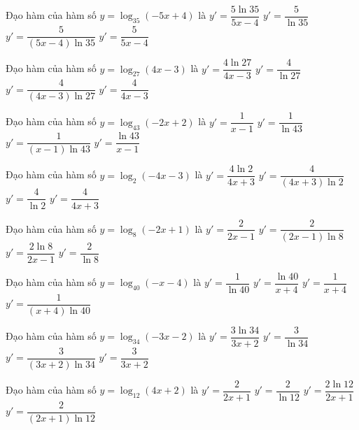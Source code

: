 \documentclass[12pt,a4paper]{article}
\begin{document}
\begin{ex}
Đạo hàm của hàm số $y=\log_{35}(-5x+4)$ là
\choice
{$y'=\dfrac{5\ln{35}}{5x-4}$}
{$y'=\dfrac{5}{\ln{35}}$}
{\True $y'=\dfrac{5}{(5x-4)\ln 35}$}
{$y'=\dfrac{5}{5x-4}$}
\end{ex}
\begin{ex}
Đạo hàm của hàm số $y=\log_{27}(4x-3)$ là
\choice
{$y'=\dfrac{4\ln{27}}{4x-3}$}
{$y'=\dfrac{4}{\ln{27}}$}
{\True $y'=\dfrac{4}{(4x-3)\ln 27}$}
{$y'=\dfrac{4}{4x-3}$}
\end{ex}
\begin{ex}
Đạo hàm của hàm số $y=\log_{43}(-2x+2)$ là
\choice
{$y'=\dfrac{1}{x-1}$}
{$y'=\dfrac{1}{\ln{43}}$}
{\True $y'=\dfrac{1}{(x-1)\ln 43}$}
{$y'=\dfrac{\ln{43}}{x-1}$}
\end{ex}
\begin{ex}
Đạo hàm của hàm số $y=\log_2(-4x-3)$ là
\choice
{$y'=\dfrac{4\ln{2}}{4x+3}$}
{\True $y'=\dfrac{4}{(4x+3)\ln 2}$}
{$y'=\dfrac{4}{\ln{2}}$}
{$y'=\dfrac{4}{4x+3}$}
\end{ex}
\begin{ex}
Đạo hàm của hàm số $y=\log_8(-2x+1)$ là
\choice
{$y'=\dfrac{2}{2x-1}$}
{\True $y'=\dfrac{2}{(2x-1)\ln 8}$}
{$y'=\dfrac{2\ln{8}}{2x-1}$}
{$y'=\dfrac{2}{\ln{8}}$}
\end{ex}
\begin{ex}
Đạo hàm của hàm số $y=\log_{40}(-x-4)$ là
\choice
{$y'=\dfrac{1}{\ln{40}}$}
{$y'=\dfrac{\ln{40}}{x+4}$}
{$y'=\dfrac{1}{x+4}$}
{\True $y'=\dfrac{1}{(x+4)\ln 40}$}
\end{ex}
\begin{ex}
Đạo hàm của hàm số $y=\log_{34}(-3x-2)$ là
\choice
{$y'=\dfrac{3\ln{34}}{3x+2}$}
{$y'=\dfrac{3}{\ln{34}}$}
{\True $y'=\dfrac{3}{(3x+2)\ln 34}$}
{$y'=\dfrac{3}{3x+2}$}
\end{ex}
\begin{ex}
Đạo hàm của hàm số $y=\log_{12}(4x+2)$ là
\choice
{$y'=\dfrac{2}{2x+1}$}
{$y'=\dfrac{2}{\ln{12}}$}
{$y'=\dfrac{2\ln{12}}{2x+1}$}
{\True $y'=\dfrac{2}{(2x+1)\ln 12}$}
\end{ex}
\end{document}
